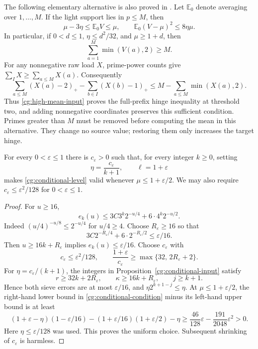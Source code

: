 The following elementary alternative is also proved in
\cite{Synthesis}. Let $\mathbb E_0$ denote averaging over
$1,\ldots,M$. If the light support lies in $p\le M$, then
\begin{equation}
 \mu-3\eta\le\mathbb E_0V\le\mu,
 \qquad \mathbb E_0(V-\mu)^2\le8\eta\mu.
 \label{cg:moment-input}
\end{equation}
In particular, if $0<d\le1$, $\eta\le d^2/32$, and
$\mu\ge1+d$, then
\begin{equation}
 \sum_{a=1}^M\min(V(a),2)\ge M.
 \label{cg:high-mean-input}
\end{equation}
For any nonnegative raw load $X$, prime-power counts give
$\sum_I X\ge\sum_{a\le M}X(a)$. Consequently
\begin{equation}
 \sum_{a\le M}(X(a)-2)_+-\sum_{b\in I}(X(b)-1)_+
 \le M-\sum_{a\le M}\min(X(a),2).
 \label{cg:automatic}
\end{equation}
Thus \eqref{cg:high-mean-input} proves the full-prefix hinge inequality
at threshold two, and adding nonnegative coordinates preserves this
sufficient condition. Primes greater than $M$ must be removed before
computing the mean in this alternative. They change no source value;
restoring them only increases the target hinge.

\begin{lemma}
\label{cg:uniform-eta}
For every $0<\varepsilon\le1$ there is $c_\varepsilon>0$ such that,
for every integer $k\ge0$, setting
\[
 \eta=\frac{c_\varepsilon}{k+1},\qquad \ell=1+\varepsilon
\]
makes \eqref{cg:conditional-level} valid whenever
$\mu\le1+\varepsilon/2$. We may also require
$c_\varepsilon\le\varepsilon^2/128$ for $0<\varepsilon\le1$.
\end{lemma}

\begin{proof}
For $u\ge16$,
\[
 e_k(u)\le3C3^k2^{-u/4}+6\cdot4^k2^{-u/2}.
\]
Indeed $(u/4)^{-u/8}\le2^{-u/4}$ for $u/4\ge4$.
Choose $R_\varepsilon\ge16$ so that
\[
 3C2^{-R_\varepsilon/4}+6\cdot2^{-R_\varepsilon/2}
 \le\varepsilon/16.
\]
Then $u\ge16k+R_\varepsilon$ implies
$e_k(u)\le\varepsilon/16$. Choose $c_\varepsilon$ with
\[
 c_\varepsilon\le\varepsilon^2/128,
 \qquad
 \frac{1+\varepsilon}{c_\varepsilon}
 \ge\max\{32,\,2R_\varepsilon+2\}.
\]
For $\eta=c_\varepsilon/(k+1)$, the integers in
Proposition~\ref{cg:conditional-input} satisfy
\[
 r\ge32k+2R_\varepsilon,\qquad
 \kappa\ge16k+R_\varepsilon,\qquad j\ge k+1.
\]
Hence both sieve errors are at most $\varepsilon/16$, and
$\eta2^{k+1-j}\le\eta$. At $\mu\le1+\varepsilon/2$, the
right-hand lower bound in \eqref{cg:conditional-condition} minus
its left-hand upper bound is at least
\[
 (1+\varepsilon-\eta)(1-\varepsilon/16)
 -(1+\varepsilon/16)(1+\varepsilon/2)-\eta
 \ge\frac{46}{128}\varepsilon-\frac{191}{2048}\varepsilon^2>0.
\]
Here $\eta\le\varepsilon/128$ was used. This proves the uniform
choice. Subsequent shrinking of $c_\varepsilon$ is harmless.
\end{proof}

